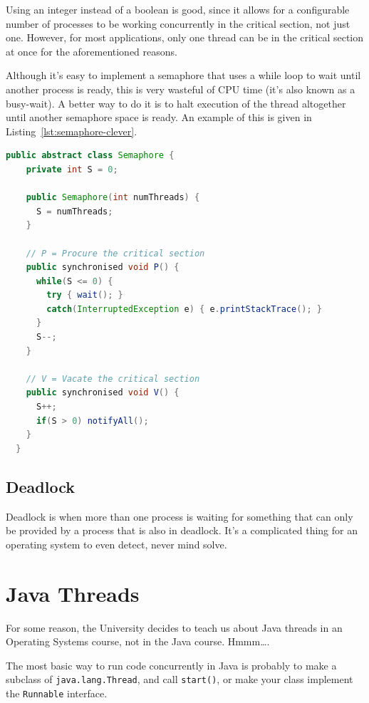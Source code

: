 Using an integer instead of a boolean is good, since it allows for a
configurable number of processes to be working concurrently in the critical
section, not just one. However, for most applications, only one thread can be in
the critical section at once for the aforementioned reasons.

Although it's easy to implement a semaphore that uses a while loop to wait until
another process is ready, this is very wasteful of CPU time (it's also known as
a busy-wait). A better way to do it is to halt execution of the thread
altogether until another semaphore space is ready. An example of this is given
in Listing~\ref{lst:semaphore-clever}.

\begin{lstlisting}[language=Java, label=lst:semaphore-clever, caption={A Java
                   implementation of a Semaphore that doesn't use busy loops}]
  public abstract class Semaphore {
    private int S = 0;

    public Semaphore(int numThreads) {
      S = numThreads;
    }

    // P = Procure the critical section
    public synchronised void P() {
      while(S <= 0) {
        try { wait(); }
        catch(InterruptedException e) { e.printStackTrace(); }
      }
      S--;
    }

    // V = Vacate the critical section
    public synchronised void V() {
      S++;
      if(S > 0) notifyAll();
    }
  }
\end{lstlisting}

\subsection{Deadlock}

Deadlock is when more than one process is waiting for something that can only be
provided by a process that is also in deadlock. It's a complicated thing for an
operating system to even detect, never mind solve.

\section{Java Threads}

For some reason, the University decides to teach us about Java threads in an
Operating Systems course, not in the Java course. Hmmm\dots.

The most basic way to run code concurrently in Java is probably to make a
subclass of \texttt{java.lang.Thread}, and call \texttt{start()}, or make your
class implement the \texttt{Runnable} interface.

